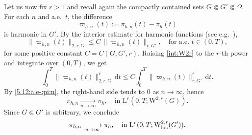 \documentclass[12pt,reqno]{amsart}
\numberwithin{equation}{section}
\theoremstyle{definition}
\def\dt{\,\mathrm{d}t}
\def\W{\mathrm{W}}
\def\L{\mathrm{L}}
\begin{document}
{
Let us now fix $r>1$ and recall again the compactly contained sets $G\Subset G'\Subset \Omega$.
For each $n$ and a.e.\ $t$, the difference
\begin{equation*}
\varpi_{h,n}(t):=\pi_{h,n}(t)-\pi_h(t)
\end{equation*}
is harmonic in $G'$.
By the interior estimate for harmonic functions (see e.g.~\cite[Theorem~9.11]{GT:1998}),
\begin{equation}\label{int:W2r}
\|\varpi_{h,n}(t)\|_{2,r,G} \leq C\,\|\varpi_{h,n}(t)\|_{r,G'}, \quad \text{for a.e.\ } t\in(0,T),
\end{equation}
for some positive constant $C=C(G,G',r)$.
Raising \eqref{int:W2r} to the $r$-th power and integrate over $(0,T)$, we get
\begin{equation*}
\int_{0}^{T}\|\varpi_{h,n}(t)\|_{2,r,G}^r\dt \leq C\int_{0}^{T}\|\varpi_{h,n}(t)\|_{r,G'}^r\dt.
\end{equation*}
By \eqref{5.12:a.e-:pi:n}, the right-hand side tends to $0$ as $n\to\infty$, hence
\begin{equation*}
\pi_{h,n}\xrightarrow[n \to \infty]{} \pi_h, \quad \text{in } \L^{r}(0,T;\W^{2,r}(G)).
\end{equation*}
Since $G\Subset G'$ is arbitrary, we conclude
\begin{equation}\label{str:con:W2r}
\pi_{h,n}\xrightarrow[n \to \infty]{} \pi_h, \quad \text{in } \L^{r}(0,T;\W^{2,r}_{\rm loc}(G')).
\end{equation}


}
\end{document}

